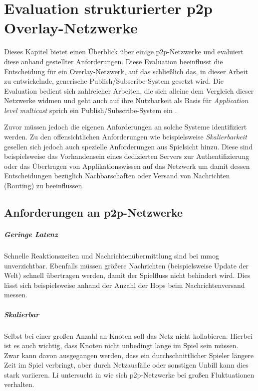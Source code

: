 \chapter{Evaluation strukturierter p2p Overlay-Netzwerke}
\label{chap:evaluation_p2p}

Dieses Kapitel bietet einen Überblick über einige p2p-Netzwerke und evaluiert diese anhand gestellter Anforderungen. Diese Evaluation beeinflusst die Entscheidung für ein Overlay-Netzwerk, auf das schließlich das, in dieser Arbeit zu entwickelnde, generische Publish/Subscribe-System gesetzt wird. Die Evaluation bedient sich zahlreicher Arbeiten, die sich alleine dem Vergleich dieser Netzwerke widmen \cite{Lua2005Survey, Goetz2005, Li2004Comparing, Darlagiannis2006Peertopeer, Castro2002Secure, Bo2003PeertoPeer} und geht auch auf ihre Nutzbarkeit als Basis für \emph{Application level multicast} sprich ein Publish/Subscribe-System ein \cite{Hosseini2007Survey, Fahmy2007, Castro2003Evaluation, Ratnasamy2001}.

Zuvor müssen jedoch die eigenen Anforderungen an solche Systeme identifiziert werden. Zu den offensichtlichen Anforderungen wie beispielsweise \emph{Skalierbarkeit} gesellen sich jedoch auch spezielle Anforderungen aus Spielsicht hinzu. Diese sind beispielsweise das Vorhandensein eines dedizierten Servers zur Authentifizierung oder das Übertragen von Applikationswissen auf das Netzwerk um damit dessen Entscheidungen bezüglich Nachbarschaften oder Versand von Nachrichten (Routing) zu beeinflussen.

\section{Anforderungen an p2p-Netzwerke}

\paragraph{Geringe Latenz} Schnelle Reaktionszeiten und Nachrichtenübermittlung sind bei \ac{mmog} unverzichtbar. Ebenfalls müssen größere Nachrichten (beispielsweise Update der Welt) schnell übertragen werden, damit der Spielfluss nicht behindert wird. Dies lässt sich beispielsweise anhand der Anzahl der Hops beim Nachrichtenversand messen.

\paragraph{Skalierbar} Selbst bei einer großen Anzahl an Knoten soll das Netz nicht kollabieren. Hierbei ist es auch wichtig, dass Knoten nicht unbedingt lange im Spiel sein müssen. Zwar kann davon ausgegangen werden, dass ein durchschnittlicher Spieler längere Zeit im Spiel verbringt, aber durch Netzausfälle oder sonstigen Unbill kann dies stark variieren. Li untersucht in \cite{Li2004Comparing} wie sich p2p-Netzwerke bei großen Fluktuationen verhalten.

